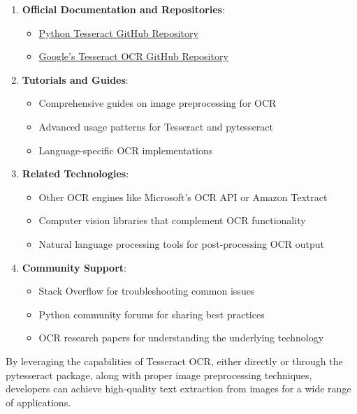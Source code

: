 \documentclass{article}
\begin{document}
	\begin{enumerate}
		\item \textbf{Official Documentation and Repositories}:
		\begin{itemize}
			\item \href{https://github.com/madmaze/pytesseract}{Python Tesseract GitHub Repository}
			\item \href{https://github.com/tesseract-ocr/tesseract}{Google's Tesseract OCR GitHub Repository}
		\end{itemize}
		
		\item \textbf{Tutorials and Guides}:
		\begin{itemize}
			\item Comprehensive guides on image preprocessing for OCR
			\item Advanced usage patterns for Tesseract and pytesseract
			\item Language-specific OCR implementations
		\end{itemize}
		
		\item \textbf{Related Technologies}:
		\begin{itemize}
			\item Other OCR engines like Microsoft's OCR API or Amazon Textract
			\item Computer vision libraries that complement OCR functionality
			\item Natural language processing tools for post-processing OCR output
		\end{itemize}
		
		\item \textbf{Community Support}:
		\begin{itemize}
			\item Stack Overflow for troubleshooting common issues \cite {Reddit:2023}
			\item Python community forums for sharing best practices
			\item OCR research papers for understanding the underlying technology \cite {DataCamp:2024, Betterpath:2023, Nutrient:2025, GeekyAnts:2023}
		\end{itemize}
	\end{enumerate}
	
	By leveraging the capabilities of Tesseract OCR, either directly or through the pytesseract package, along with proper image preprocessing techniques, developers can achieve high-quality text extraction from images for a wide range of applications.
	
	
	
	
\end{document}
